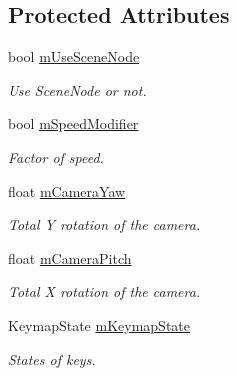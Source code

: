 \subsection*{Protected Attributes}
\begin{DoxyCompactItemize}
\item 
bool \hyperlink{class_common_1_1_camera_controller_a193fd601715f0b7aa3bf772f078200d0}{m\+Use\+Scene\+Node}
\begin{DoxyCompactList}\small\item\em Use Scene\+Node or not. \end{DoxyCompactList}\item 
\mbox{\label{class_common_1_1_camera_controller_a3652121296a21279131ce9197ea57995}} 
bool \hyperlink{class_common_1_1_camera_controller_a3652121296a21279131ce9197ea57995}{m\+Speed\+Modifier}
\begin{DoxyCompactList}\small\item\em Factor of speed. \end{DoxyCompactList}\item 
\mbox{\label{class_common_1_1_camera_controller_af0c031abefd0e2caebdc18795d1953df}} 
float \hyperlink{class_common_1_1_camera_controller_af0c031abefd0e2caebdc18795d1953df}{m\+Camera\+Yaw}
\begin{DoxyCompactList}\small\item\em Total Y rotation of the camera. \end{DoxyCompactList}\item 
\mbox{\label{class_common_1_1_camera_controller_a53ffb8220c31ac47f8c7c336a4bebe62}} 
float \hyperlink{class_common_1_1_camera_controller_a53ffb8220c31ac47f8c7c336a4bebe62}{m\+Camera\+Pitch}
\begin{DoxyCompactList}\small\item\em Total X rotation of the camera. \end{DoxyCompactList}\item 
\mbox{\label{class_common_1_1_camera_controller_a6de401fd5501b9f48aab9efc11e5da68}} 
Keymap\+State \hyperlink{class_common_1_1_camera_controller_a6de401fd5501b9f48aab9efc11e5da68}{m\+Keymap\+State}
\begin{DoxyCompactList}\small\item\em States of keys. \end{DoxyCompactList}\item 

\end{DoxyCompactItemize}
